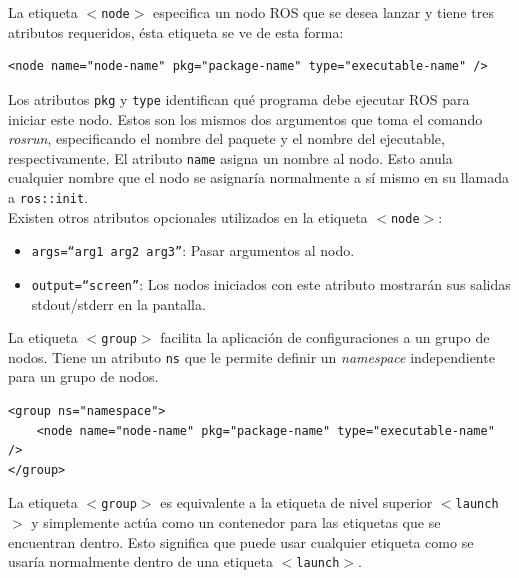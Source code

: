 \documentclass[12pt,twoside,final]{book}
\begin{document}
La etiqueta \texttt{$ < $node$ > $} especifica un nodo ROS que se desea lanzar y tiene tres atributos requeridos, ésta etiqueta se ve de esta forma:

\begin{verbatim}
<node name="node-name" pkg="package-name" type="executable-name" />
\end{verbatim}

Los atributos \texttt{pkg} y \texttt{type} identifican qué programa debe ejecutar ROS para iniciar este nodo. Estos son los mismos dos argumentos que toma el comando \textit{rosrun}, especificando el nombre del paquete y el nombre del ejecutable, respectivamente. El atributo \texttt{name} asigna un nombre al nodo. Esto anula cualquier nombre que el nodo se asignaría normalmente a sí mismo en su llamada a \texttt{ros::init}.\\

Existen otros atributos opcionales utilizados en la etiqueta \texttt{$ < $node$ > $}:
\begin{itemize}
\item \texttt{args=``arg1 arg2 arg3''}: Pasar argumentos al nodo.
\item \texttt{output=``screen''}: Los nodos iniciados con este atributo mostrarán sus salidas stdout/stderr  en la pantalla.
\end{itemize}
 

La etiqueta \texttt{$ < $group$ > $} facilita la aplicación de configuraciones a un grupo de nodos. Tiene un atributo \texttt{ns} que le permite definir un \textit{namespace} independiente para un grupo de nodos.

\begin{verbatim}
<group ns="namespace">
	<node name="node-name" pkg="package-name" type="executable-name" />
</group>
\end{verbatim}

La etiqueta \texttt{$ < $group$ > $} es equivalente a la etiqueta de nivel superior \texttt{$ < $launch$ > $} y simplemente actúa como un contenedor para las etiquetas que se encuentran dentro. Esto significa que puede usar cualquier etiqueta como se usaría normalmente dentro de una etiqueta \texttt{$ < $launch$ > $}.\\
\end{document}
